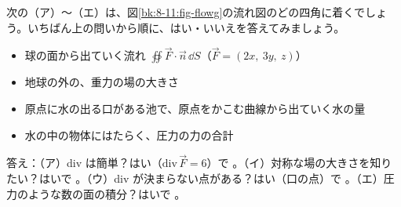 \begin{yattemiyou}[流れ図でたどってみよう]
次の（ア）〜（エ）は、図\ref{bk:8-11:fig-flowg}の流れ図のどの四角に着くでしょう。いちばん上の問いから順に、はい・いいえを答えてみましょう。
\begin{itemize}
\item[（ア）] 球の面から出ていく流れ $\oiint\vec F\cdot\vec n\,\dd S$（$\vec F=(2x,\ 3y,\ z)$）
\item[（イ）] 地球の外の、重力の場の大きさ
\item[（ウ）] 原点に水の出る口がある池で、原点をかこむ曲線から出ていく水の量
\item[（エ）] 水の中の物体にはたらく、圧力の力の合計
\end{itemize}
{\small 答え：（ア）div は簡単？\enspace はい（$\mathrm{div}\,\vec F=6$）で 。（イ）対称な場の大きさを知りたい？\enspace はいで 。（ウ）div が決まらない点がある？\enspace はい（口の点）で 。（エ）圧力のような数の面の積分？\enspace はいで 。\par}
\end{yattemiyou}

